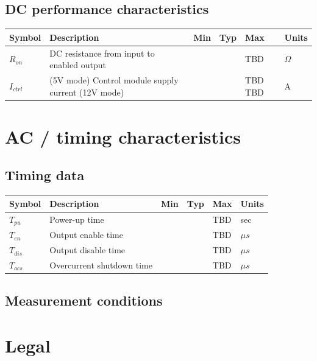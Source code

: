\documentclass{article}
\begin{document}
\subsection{DC performance characteristics}

\begin{longtable}{|l|p{2.5in}|p{0.5in}|p{0.5in}|p{0.5in}|p{0.5in}|}
\hline
{\bf Symbol} & {\bf Description} & {\bf Min} & {\bf Typ} & {\bf Max} & {\bf Units}\\
\hline
$R_{on}$ & DC resistance from input to enabled output & & & TBD & $\Omega$\\
\hline
$I_{ctrl}$ & (5V mode) Control module supply current \newline (12V mode) & & & TBD \newline TBD & A\\
\hline
\end{longtable}

\pagebreak
\section{AC / timing characteristics}

\subsection{Timing data}

\begin{longtable}{|l|p{2in}|p{0.5in}|p{0.65in}|p{0.65in}|p{0.5in}|}
\hline
{\bf Symbol} & {\bf Description} & {\bf Min} & {\bf Typ} & {\bf Max} & {\bf Units}\\
\hline
$T_{pu}$ & Power-up time & & & TBD & sec\\
\hline
$T_{en}$ & Output enable time & & & TBD & $\mu s$\\
\hline
$T_{dis}$ & Output disable time & & & TBD & $\mu s$\\
\hline
$T_{ocs}$ & Overcurrent shutdown time & & & TBD & $\mu s$\\
\hline
\end{longtable}

\subsection{Measurement conditions}

\pagebreak
\section{Legal}
\end{document}
